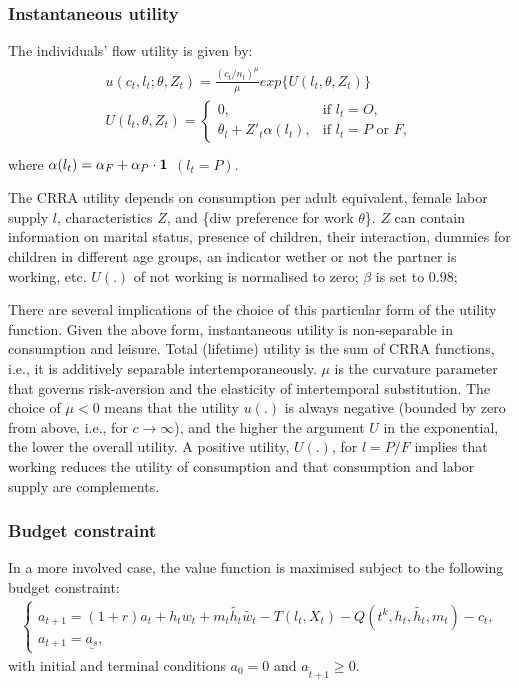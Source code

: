 \documentclass[letterpaper,10pt,english]{sphinxmanual}
\begin{document}
\subsubsection{Instantaneous utility}
\label{\detokenize{computational_model:instantaneous-utility}}
The individuals’ flow utility is given by:
\begin{align*}\!\begin{aligned}
u(c_t, l_t; \theta, Z_t) = \frac{(c_t/n_t)^\mu}{\mu}exp\{U(l_t, \theta, Z_t)\}\\
U(l_t, \theta, Z_t) =
\begin{cases}
0, & \text{if $l_t = O$,}
\\[4pt]
\theta_l + Z'_t\alpha(l_t), & \text{if $l_t = P$ or $F$},
\end{cases}\\
\end{aligned}\end{align*}
where \(\alpha(l_t) = \alpha_F + \alpha_P \cdot \bf{1}\) \((l_t = P)\).

The CRRA utility depends on consumption per adult equivalent, female labor supply \(l\), characteristics \(Z\), and \{diw preference for work \(\theta\)\}. \(Z\) can contain information on marital status, presence of children, their interaction, dummies for children in different age groups, an indicator wether or not the partner is working, etc. \(U(.)\) of not working is normalised to zero; \(\beta\) is set to 0.98;

There are several implications of the choice of this particular form of the utility function. Given the above form, instantaneous utility is non-separable in consumption and leisure. Total (lifetime) utility is the sum of CRRA functions, i.e., it is additively separable intertemporaneously. \(\mu\) is the curvature parameter that governs risk-aversion and the elasticity of intertemporal substitution. The choice of \(\mu<0\) means that the utility \(u(.)\) is always negative (bounded by zero from above, i.e., for \(c\rightarrow \infty\)), and the higher the argument \(U\) in the exponential, the lower the overall utility. A positive utility, \(U(.)\),  for \(l = P/F\) implies that working reduces the utility of consumption and that consumption and labor supply are complements.


\subsubsection{Budget constraint}
\label{\detokenize{computational_model:budget-constraint}}
In a more involved case, the value function is maximised subject to the following budget constraint:
\begin{equation*}
\begin{split}\begin{cases}
a_{t+1} = (1+r)a_t + h_t w_t + m_t \tilde{h_t} \tilde{w_t} - T(l_t, X_t) - Q(t^k, h_t, \tilde{h_t}, m_t) - c_t,
\\[4pt]
a_{t+1} = \underline{a_s},
\end{cases}\end{split}
\end{equation*}
with initial and terminal conditions \(a_0 = 0\) and \(a_{\tilde{t}+1} \geq 0\).
\end{document}
